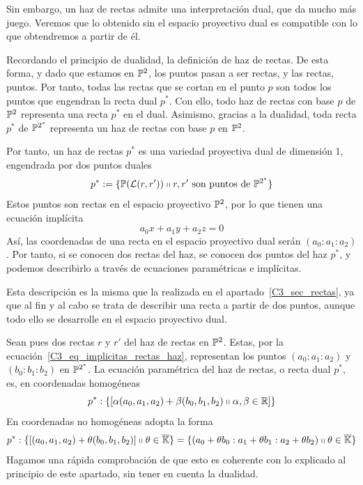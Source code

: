 Sin embargo, un haz de rectas admite una interpretación dual, que da mucho más juego. Veremos que lo obtenido sin el espacio proyectivo dual es compatible con lo que obtendremos a partir de él.

Recordando el principio de dualidad,  la definición de haz de rectas. De esta forma, y dado que estamos en $\mathbb{P}^2$, los puntos pasan a ser rectas, y las rectas, puntos. Por tanto, todas las rectas que se cortan en el punto $p$ son todos los puntos que engendran la recta dual $p^*$. Con ello, todo haz de rectas con base $p$ de $\mathbb{P}^2$ representa una recta $p^*$ en el dual. Asimismo, gracias a la dualidad, toda recta $p^*$ de $\mathbb{P}^{2^*}$ representa un haz de rectas con base $p$ en $\mathbb{P}^2$.

Por tanto, un haz de rectas $p^*$ es una variedad proyectiva dual de dimensión 1, engendrada por dos puntos duales
\begin{equation}
	p^*:=\{\mathbb{P}(\mathcal{L}(r,r'))\shortparallel r,r'\text{ son puntos de }\mathbb{P}^{2^*}\}
\end{equation}
Estos puntos son rectas en el espacio proyectivo $\mathbb{P}^2$, por lo que tienen una ecuación implícita
\begin{equation*}
	a_0x+a_1y+a_2z=0
\end{equation*}
Así, las coordenadas de una recta en el espacio proyectivo dual serán $(a_0:a_1:a_2)$. Por tanto, si se conocen dos rectas del haz, se conocen dos puntos del haz $p^*$, y podemos describirlo a través de ecuaciones paramétricas e implícitas. 

Esta descripción es la misma que la realizada en el apartado~\ref{C3_sec_rectas}, ya que al fin y al cabo se trata de describir una recta a partir de dos puntos, aunque todo ello se desarrolle en el espacio proyectivo dual. 

Sean pues dos rectas $r$ y $r'$ del haz de rectas en $\mathbb{P}^2$. Estas, por la ecuación~\eqref{C3_eq_implicitas_rectas_haz}, representan los puntos $(a_0:a_1:a_2)$ y $(b_0:b_1:b_2)$ en $\mathbb{P}^{2^*}$. La ecuación paramétrica del haz de rectas, o recta dual $p^*$, es, en coordenadas homogéneas
\begin{equation}
	p^*:\{\left [ \alpha (a_0,a_1,a_2)+\beta (b_0,b_1,b_2)\shortparallel \alpha,\beta\in\mathbb{R} \right ]\}
\end{equation}
En coordenadas no homogéneas adopta la forma
\begin{equation}
p^*:\{\left [ (a_0,a_1,a_2)+\theta (b_0,b_1,b_2) \right ]\shortparallel \theta\in\overline{\mathbb{K}}\}=\{(a_0+\theta b_0:a_1+\theta b_1:a_2+\theta b_2)\shortparallel \theta\in\overline{\mathbb{K}}\}
\end{equation}
Hagamos una rápida comprobación de que esto es coherente con lo explicado al principio de este apartado, sin tener en cuenta la dualidad. 

